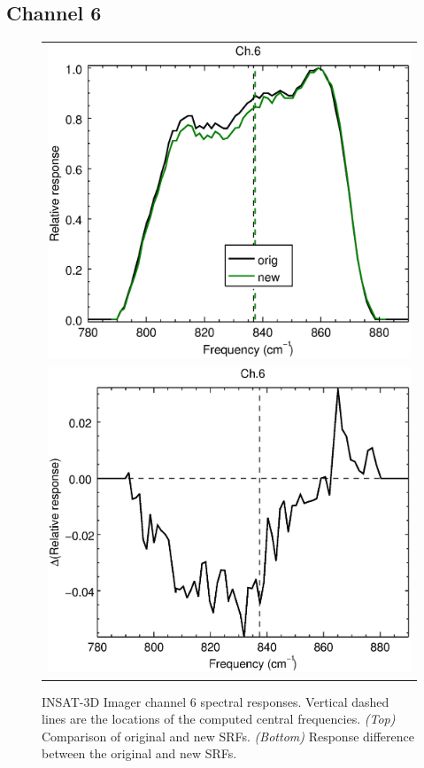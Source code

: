 \subsection{Channel 6}
\begin{figure}[H]
  \label{fig:imgr_ch6}
  \centering
  \begin{tabular}{c}
    \includegraphics[scale=0.55]{graphics/imgr/srf/imgr_insat3d-6.eps} \\
    \includegraphics[scale=0.55]{graphics/imgr/srf/imgr_insat3d-6.difference.eps}
  \end{tabular}
  \caption{INSAT-3D Imager channel 6 spectral responses. Vertical dashed lines are the locations of the computed central frequencies. \emph{(Top)} Comparison of original and new SRFs. \emph{(Bottom)} Response difference between the original and new SRFs.}
\end{figure}
